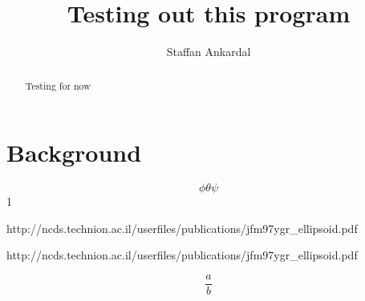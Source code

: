 \documentclass[]{book}
\title{Testing out this program}
\author{Staffan Ankardal}
\begin{document}
\maketitle

\begin{abstract}
Testing for now
\end{abstract}

\section{Background}
\begin{equation}
\phi \theta \psi
\end{equation}1

http://ncds.technion.ac.il/userfiles/publications/jfm97ygr_ellipsoid.pdf

http://ncds.technion.ac.il/userfiles/publications/jfm97ygr_ellipsoid.pdf





\begin{equation}
\frac{a}{b}
\end{equation}
 
		
\end{document}
